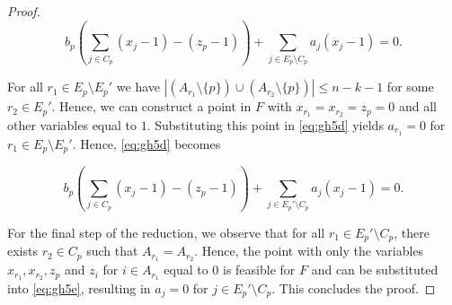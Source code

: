 \documentclass[12pt]{article}
\newcommand{\lp}{\left(}
\newcommand{\rp}{\right)}
\newcommand{\sm}{\setminus}
\begin{document}
\begin{proof}
\begin{equation}
b_p \lp \sum_{j \in C_p} \lp x_j - 1 \rp - \lp z_p - 1 \rp \rp + \sum_{j \in E_p \sm C_p } a_j (x_j - 1) = 0.
\label{eq:gh5d}
\end{equation}

For all $r_1 \in E_p \sm E_p'$ we have $|(A_{r_1} \sm \{p\}) \cup (A_{r_2} \sm \{p\})| \leq n-k-1$ for some $r_2 \in E_p'$. Hence, we can construct a point in $F$ with $x_{r_1} = x_{r_2} = z_p = 0$ and all other variables equal to $1$. Substituting this point in \eqref{eq:gh5d} yields $a_{r_1} = 0$ for $r_1 \in E_p \sm E_p'$. Hence, \eqref{eq:gh5d} becomes

\begin{equation}
b_p \lp \sum_{j \in C_p} \lp x_j - 1 \rp - \lp z_p - 1 \rp \rp + \sum_{j \in E_p' \sm C_p } a_j (x_j - 1) = 0.
\label{eq:gh5e}
\end{equation}

For the final step of the reduction, we observe that for all $r_1 \in E_p' \sm C_p$, there exists $r_2 \in C_p$ such that $A_{r_1} = A_{r_2}$. Hence, the point with only the variables $x_{r_1},x_{r_2},z_p$ and $z_i$ for $i \in A_{r_1}$ equal to $0$ is feasible for $F$ and can be substituted into \eqref{eq:gh5e}, resulting in $a_j = 0$ for $j \in E_p' \sm C_p$. This concludes the proof.
\end{proof}
\end{document}
